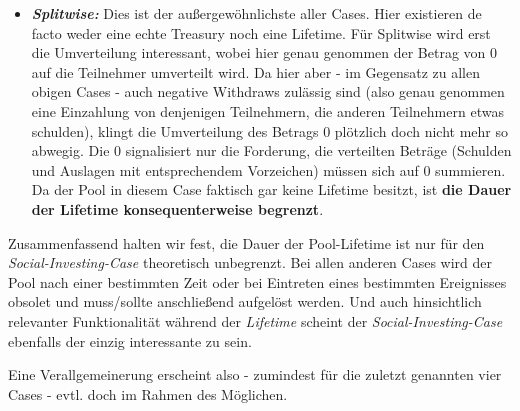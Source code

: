 \begin{itemize}
  \item \textbf{\textit{Splitwise:}} Dies ist der außergewöhnlichste aller Cases. Hier existieren de facto weder eine echte Treasury noch eine Lifetime. Für Splitwise wird erst die Umverteilung interessant, wobei hier genau genommen der Betrag von 0 auf die Teilnehmer umverteilt wird. Da hier aber - im Gegensatz zu allen obigen Cases - auch negative Withdraws zulässig sind (also genau genommen eine Einzahlung von denjenigen Teilnehmern, die anderen Teilnehmern etwas schulden), klingt die Umverteilung des Betrags 0 plötzlich doch nicht mehr so abwegig. Die 0 signalisiert nur die Forderung, die verteilten Beträge (Schulden und Auslagen mit entsprechendem Vorzeichen) müssen sich auf 0 summieren. Da der Pool in diesem Case faktisch gar keine Lifetime besitzt, ist \textbf{die Dauer der Lifetime konsequenterweise begrenzt}.
\end{itemize}

\vspace{0.3cm}

Zusammenfassend halten wir fest, die Dauer der Pool-Lifetime ist nur für den \textit{Social-Investing-Case} theoretisch unbegrenzt. Bei allen anderen Cases wird der Pool nach einer bestimmten Zeit oder bei Eintreten eines bestimmten Ereignisses obsolet und muss/sollte anschließend aufgelöst werden. Und auch hinsichtlich relevanter Funktionalität während der \textit{Lifetime} scheint der \textit{Social-Investing-Case} ebenfalls der einzig interessante zu sein. 

\vspace{0.1cm}

Eine Verallgemeinerung erscheint also - zumindest für die zuletzt genannten vier Cases - evtl. doch im Rahmen des Möglichen. 

\vspace{0.3cm}


\vspace{0.5cm}